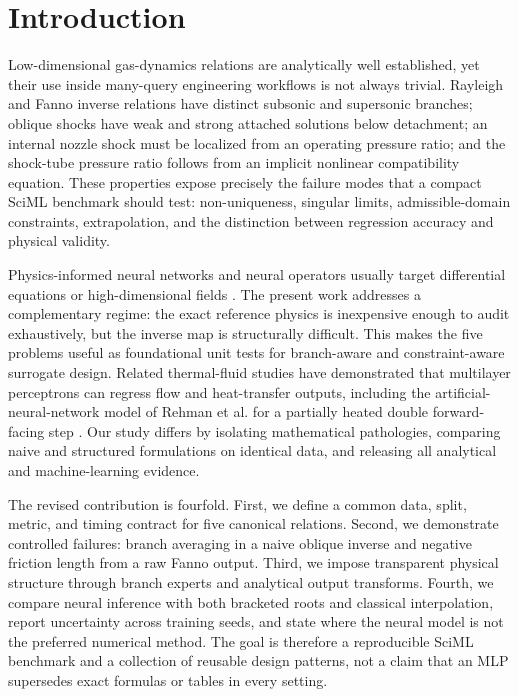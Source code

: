 \documentclass[11pt]{article}
\newenvironment{revision}{\color{revisionblue}}{}
\newenvironment{revision}{}{}
\begin{document}
\begin{revision}
\section{Introduction}
Low-dimensional gas-dynamics relations are analytically well established, yet their use inside many-query engineering workflows is not always trivial. Rayleigh and Fanno inverse relations have distinct subsonic and supersonic branches; oblique shocks have weak and strong attached solutions below detachment; an internal nozzle shock must be localized from an operating pressure ratio; and the shock-tube pressure ratio follows from an implicit nonlinear compatibility equation. These properties expose precisely the failure modes that a compact SciML benchmark should test: non-uniqueness, singular limits, admissible-domain constraints, extrapolation, and the distinction between regression accuracy and physical validity.

Physics-informed neural networks and neural operators usually target differential equations or high-dimensional fields \cite{raissi2019,karniadakis2021,lu2021,li2021}. The present work addresses a complementary regime: the exact reference physics is inexpensive enough to audit exhaustively, but the inverse map is structurally difficult. This makes the five problems useful as foundational unit tests for branch-aware and constraint-aware surrogate design. Related thermal-fluid studies have demonstrated that multilayer perceptrons can regress flow and heat-transfer outputs, including the artificial-neural-network model of Rehman et al. for a partially heated double forward-facing step \cite{rehman2022}. Our study differs by isolating mathematical pathologies, comparing naive and structured formulations on identical data, and releasing all analytical and machine-learning evidence.

The revised contribution is fourfold. First, we define a common data, split, metric, and timing contract for five canonical relations. Second, we demonstrate controlled failures: branch averaging in a naive oblique inverse and negative friction length from a raw Fanno output. Third, we impose transparent physical structure through branch experts and analytical output transforms. Fourth, we compare neural inference with both bracketed roots and classical interpolation, report uncertainty across training seeds, and state where the neural model is not the preferred numerical method. The goal is therefore a reproducible SciML benchmark and a collection of reusable design patterns, not a claim that an MLP supersedes exact formulas or tables in every setting.


\end{revision}
\end{document}
